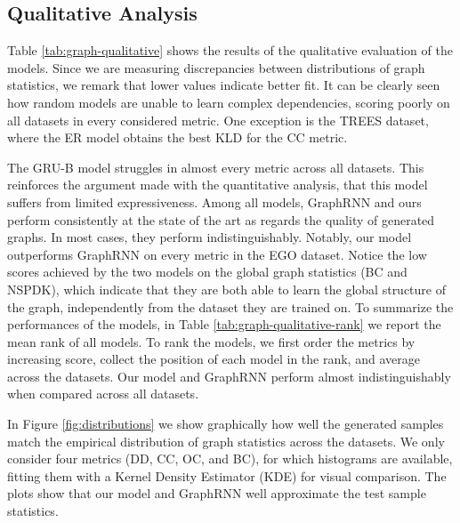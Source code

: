 \subsection{Qualitative Analysis}\label{sec:qualitative-analysis}
Table \ref{tab:graph-qualitative} shows the results of the qualitative evaluation of the models. Since we are measuring discrepancies between distributions of graph statistics, we remark that lower values indicate better fit. It can be clearly seen how random models are unable to learn complex dependencies, scoring poorly on all datasets in every considered metric. One exception is the TREES dataset, where the ER model obtains the best KLD for the CC metric.

The GRU-B model struggles in almost every metric across all datasets. This reinforces the argument made with the quantitative analysis, \ie that this model suffers from limited expressiveness. Among all models, GraphRNN and ours perform consistently at the state of the art as regards the quality of generated graphs. In most cases, they perform indistinguishably. Notably, our model outperforms GraphRNN on every metric in the EGO dataset. Notice the low scores achieved by the two models on the global graph statistics (BC and NSPDK), which indicate that they are both able to learn the global structure of the graph, independently from the dataset they are trained on. To summarize the performances of the models, in Table \ref{tab:graph-qualitative-rank} we report the mean rank of all models. To rank the models, we first order the metrics by increasing score, collect the position of each model in the rank, and average across the datasets. Our model and GraphRNN perform almost indistinguishably when compared across all datasets.

In Figure \ref{fig:distributions} we show graphically how well the generated samples match the empirical distribution of graph statistics across the datasets. We only consider four metrics (DD, CC, OC, and BC), for which histograms are available, fitting them with a Kernel Density Estimator (KDE) for visual comparison. The plots show that our model and GraphRNN well approximate the test sample statistics.

